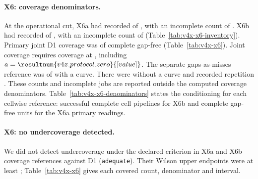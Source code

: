\paragraph{X6: coverage denominators.}
At the operational cut, X6a had recorded  of  , with an incomplete count of  . X6b had recorded  of  , with an incomplete count of   (Table~\ref{tab:v4x-x6-inventory}).
Primary joint D1 coverage was  of  complete gap-free  (Table~\ref{tab:v4x-x6}). Joint coverage requires coverage at   , including $a=\resultnum{v4x.protocol.zero}{[value]}$.
The separate gaps-as-misses reference was  of   with a curve.
There were   without a curve and  recorded repetition . These counts and incomplete jobs are reported outside the computed coverage denominators.
Table~\ref{tab:v4x-x6-denominators} states the conditioning for each cellwise reference: successful complete cell pipelines for X6b and complete gap-free units for the X6a primary readings.

\paragraph{X6: no undercoverage detected.}
We did not detect undercoverage under the declared criterion in  X6a and  X6b coverage references against D1 (\texttt{adequate}).
Their Wilson upper endpoints were at least ; Table~\ref{tab:v4x-x6} gives each covered count, denominator and interval.


